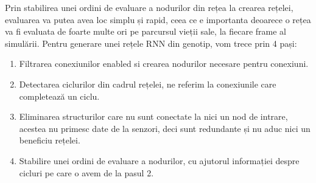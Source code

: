 Prin stabilirea unei ordini de evaluare a nodurilor din rețea la crearea rețelei, evaluarea va putea avea loc simplu și rapid, ceea ce e importanta deoarece o rețea va fi evaluata de foarte multe ori pe parcursul vieții sale, la fiecare frame al simulării.
Pentru generare unei rețele RNN din genotip, vom trece prin 4 pași:
\begin{enumerate}
    \item Filtrarea conexiunilor enabled si crearea nodurilor necesare pentru conexiuni.
    \item Detectarea ciclurilor din cadrul rețelei, ne referim la conexiunile care completează un ciclu.
    \item Eliminarea structurilor care nu sunt conectate la nici un nod de intrare, acestea nu primesc date de la senzori, deci sunt redundante și nu aduc nici un beneficiu rețelei.
    \item Stabilire unei ordini de evaluare a nodurilor, cu ajutorul informației despre cicluri pe care o avem de la pasul 2.
\end{enumerate}


